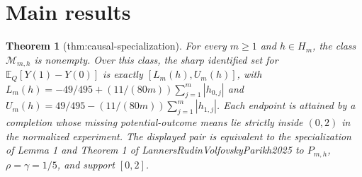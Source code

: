 \documentclass{article}
\newtheorem{theorem}{Theorem}
\begin{document}
\section{Main results}

\begin{theorem}[thm:causal-specialization]\label{thm:causal-specialization}
For every \(m\ge1\) and \(h\in H_m\), the class \(\mathcal M_{m,h}\) is nonempty. Over this class, the sharp identified set for \(\mathbb E_Q[Y(1)-Y(0)]\) is exactly \([L_m(h),U_m(h)]\), with \(L_m(h)=-49/495+(11/(80m))\sum_{j=1}^{m}|h_{0,j}|\) and \(U_m(h)=49/495-(11/(80m))\sum_{j=1}^{m}|h_{1,j}|\). Each endpoint is attained by a completion whose missing potential-outcome means lie strictly inside \((0,2)\) in the normalized experiment. The displayed pair is equivalent to the specialization of Lemma 1 and Theorem 1 of LannersRudinVolfovskyParikh2025 to \(P_{m,h}\), \(\rho=\gamma=1/5\), and support \([0,2]\).
\end{theorem}
\end{document}
